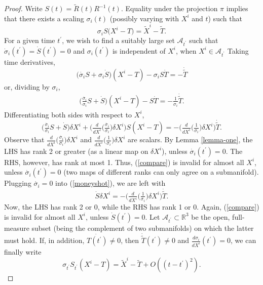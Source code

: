\documentclass[]{article}
\def\Xw{\tilde{X}}
\def\Rw{\tilde{R}}
\def\Tw{\tilde{T}}
\def\1{^{\prime}}
\def\inv{^{-1}}
\def\RR{\mathbb{R}}
\def\s{\sigma}
\def\sit{\s_{i}}
\def\dX{\delta X}
\def\subs{\subset}
\def\Aa{\mathcal{A}}
\def\ignore#1{}
\begin{document}
\begin{proof}
Write $S(t) = \Rw(t)R\inv(t)$.
Equality under the projection $\pi$ implies that there exists a scaling $\sit(t)$
(possibly varying with $X^i$ and $t$) 
such that
\begin{equation}\sit S\bigl(X^i-T)  = \Xw^i-\Tw. \label{finalform}\end{equation}
For a given time $t\1$, 
we wish to find a suitably large set $\Aa_{t\1}$ such that
$\dot\sit(t\1)=\dot S(t\1)=0$ and $\sit(t\1)$ is independent of $X^i$, when $X^i\in\Aa_{t\1}$
Taking time derivatives,
$$
\bigl({\dot{\sit}}S + \sit\dot{S}\bigr)(X^i-T) - \sit S\dot{T}
= - \dot{\Tw}
$$
or, dividing by $\sit$,
\begin{align}
\bigl(\tfrac{\dot{\sit}}{\sit}S + \dot{S}\bigr)(X^i-T) - S\dot{T}
= - \tfrac{1}{\sit}\dot{\Tw}.
\label{compare}
\end{align}
Differentiating both sides with respect to $X^i$,
\begin{equation}
\bigl(\tfrac{\dot{\sit}}{\sit}S + \dot {S}\bigr)\dX^i +
 \bigl(\tfrac{d}{dX^i}\bigl(\tfrac{\dot {\sit}}{\sit}\bigr)\dX^i\bigr) S(X^i-T) =
-\bigl(\tfrac{d}{dX^i}\bigl(\tfrac{1}{\sit}\bigr)\dX^i\bigr)\dot{\Tw}. \label{moneyshot}
\end{equation}
Observe that
$\tfrac{d}{dX^i}\bigl(\tfrac{\dot {\sit}}{\sit}\bigr)\dX^i$ and
$\tfrac{d}{dX^i}\bigl(\tfrac{1}{\sit}\bigr)\dX^i$
are scalars. 
By Lemma \ref{lemma-one}, the LHS 
has rank 2 or greater (as a linear map on $\delta X^i$), unless $\dot {\sit}(t\1)=0$.  
The RHS, however, has rank at most 1.  
Thus, (\ref{compare})
is invalid for almost all $X^i$, unless $\dot {\sit}(t\1)=0$
(two maps of different ranks can only agree on a submanifold).
Plugging $\dot {\sit}=0$ into (\ref{moneyshot}), we are left with
\begin{equation}
\dot {S}\dX^i =
-\bigl(\tfrac{d}{dX^i}\bigl(\tfrac{1}{\sigma_i}\bigr)\dX^i\bigr)\dot {\Tw}. \label{Double-moneyshot}
\end{equation}
Now, the LHS 
has rank 2 or 0, while the RHS has rank 1 or 0.
Again, (\ref{compare}) is invalid for almost all $X^i$, unless 
$\dot {S}(t\1)=0$.
Let $\Aa_{t\1}\subs\RR^3$ be the open, full-measure subset \ignore{of full measure} (being the complement of two submanifolds) on which the latter must hold.
If, in addition, $\dot {T(t\1)}\neq 0$, then $\dot{\Tw}(t\1)\neq 0$ and
$\frac{d\sigma_i}{dX^i}(t\1)=0$,
we can finally write %
$$
\sigma_{t\1} S_{t\1} (X^i - T) = \Xw^i-\Tw + O((t-t\1)^2).
$$
\end{proof}
\end{document}
